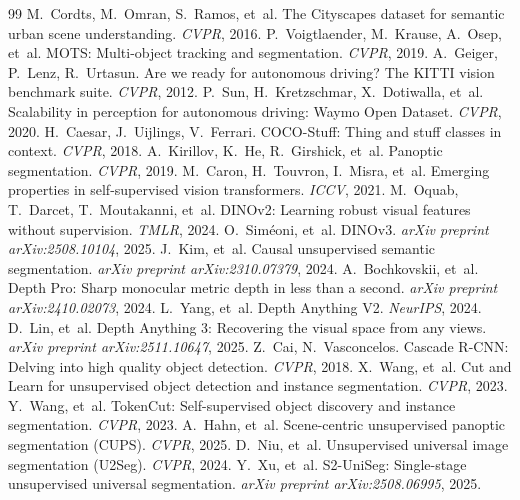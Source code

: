 \documentclass{article}
\begin{document}
\begin{thebibliography}{99}
 M.~Cordts, M.~Omran, S.~Ramos, et~al. The Cityscapes dataset for semantic urban scene understanding. \emph{CVPR}, 2016.
 P.~Voigtlaender, M.~Krause, A.~Osep, et~al. MOTS: Multi-object tracking and segmentation. \emph{CVPR}, 2019.
 A.~Geiger, P.~Lenz, R.~Urtasun. Are we ready for autonomous driving? The KITTI vision benchmark suite. \emph{CVPR}, 2012.
 P.~Sun, H.~Kretzschmar, X.~Dotiwalla, et~al. Scalability in perception for autonomous driving: Waymo Open Dataset. \emph{CVPR}, 2020.
 H.~Caesar, J.~Uijlings, V.~Ferrari. COCO-Stuff: Thing and stuff classes in context. \emph{CVPR}, 2018.
 A.~Kirillov, K.~He, R.~Girshick, et~al. Panoptic segmentation. \emph{CVPR}, 2019.
 M.~Caron, H.~Touvron, I.~Misra, et~al. Emerging properties in self-supervised vision transformers. \emph{ICCV}, 2021.
 M.~Oquab, T.~Darcet, T.~Moutakanni, et~al. DINOv2: Learning robust visual features without supervision. \emph{TMLR}, 2024.
 O.~Sim\'eoni, et~al. DINOv3. \emph{arXiv preprint arXiv:2508.10104}, 2025.
 J.~Kim, et~al. Causal unsupervised semantic segmentation. \emph{arXiv preprint arXiv:2310.07379}, 2024.
 A.~Bochkovskii, et~al. Depth Pro: Sharp monocular metric depth in less than a second. \emph{arXiv preprint arXiv:2410.02073}, 2024.
 L.~Yang, et~al. Depth Anything V2. \emph{NeurIPS}, 2024.
 D.~Lin, et~al. Depth Anything 3: Recovering the visual space from any views. \emph{arXiv preprint arXiv:2511.10647}, 2025.
 Z.~Cai, N.~Vasconcelos. Cascade R-CNN: Delving into high quality object detection. \emph{CVPR}, 2018.
 X.~Wang, et~al. Cut and Learn for unsupervised object detection and instance segmentation. \emph{CVPR}, 2023.
 Y.~Wang, et~al. TokenCut: Self-supervised object discovery and instance segmentation. \emph{CVPR}, 2023.
 A.~Hahn, et~al. Scene-centric unsupervised panoptic segmentation (CUPS). \emph{CVPR}, 2025.
 D.~Niu, et~al. Unsupervised universal image segmentation (U2Seg). \emph{CVPR}, 2024.
 Y.~Xu, et~al. S2-UniSeg: Single-stage unsupervised universal segmentation. \emph{arXiv preprint arXiv:2508.06995}, 2025.

\end{thebibliography}
\end{document}
